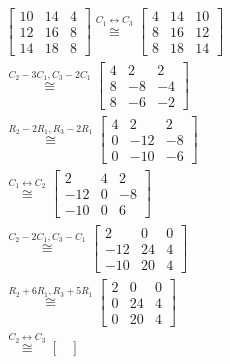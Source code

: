     	\begin{align*}
        	\begin{bmatrix}
        	10 & 14 & 4 \\
        	12 & 16 & 8 \\
        	14 & 18 & 8
        	\end{bmatrix} \stackrel{C_1\leftrightarrow C_3}{\cong} 
        	\begin{bmatrix}
        	4 & 14 & 10 \\
        	8 & 16 & 12 \\
        	8 & 18 & 14
        	\end{bmatrix}& \\  \stackrel{C_2 - 3C_1, C_3 - 2C_1}{\cong} 
        	\begin{bmatrix}
        	4 & 2 & 2 \\
        	8 & -8 & -4 \\
        	8 & -6 & -2
        	\end{bmatrix}& \\ \stackrel{R_2 - 2R_1, R_3 - 2R_1}{\cong}
        	\begin{bmatrix}
        	4 & 2 & 2 \\
        	0 & -12 & -8 \\
        	0 & -10 & -6
        	\end{bmatrix}& \\ \stackrel{C_1\leftrightarrow C_2}{\cong} 
        	\begin{bmatrix}
        	2 & 4 & 2 \\
        	-12 & 0 & -8 \\
        	-10 & 0 & 6
        	\end{bmatrix}& \\ \stackrel{C_2 - 2C_1, C_3 - C_1}{\cong} 
        	\begin{bmatrix}
        	2 & 0 & 0 \\
        	-12 & 24 & 4 \\
        	-10 & 20 & 4
        	\end{bmatrix}& \\ \stackrel{R_2 + 6R_1, R_3 + 5R_1}{\cong} 
        	\begin{bmatrix}
        	2 & 0 & 0 \\
        	0 & 24 & 4 \\
        	0 & 20 & 4
        	\end{bmatrix}& \\ \stackrel{C_2\leftrightarrow C_3}{\cong} 
        	\begin{bmatrix}

\end{bmatrix}
\end{align*}
